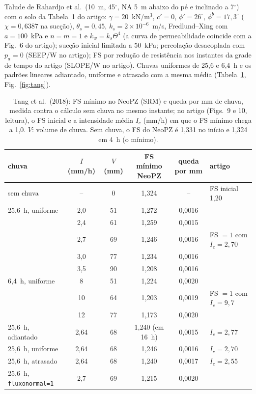 Talude de Rahardjo et al.\ (10~m, 45$^\circ$, NA 5~m abaixo do p\'e e inclinado a 7$^\circ$) com o solo da Tabela~1 do
artigo: $\gamma=20$~kN/m$^3$, $c'=0$, $\phi'=26^\circ$, $\phi^b=17{,}3^\circ$ ($\chi=0{,}6387$ na suc\c{c}\~ao),
$\theta_s=0{,}45$, $k_s=2\times10^{-6}$~m/s, Fredlund--Xing com $a=100$~kPa e $n=m=1$ e $k_w=k_s\Theta^4$ (a curva de
permeabilidade coincide com a Fig.~6 do artigo); suc\c{c}\~ao inicial limitada a 50~kPa; percola\c{c}\~ao
desacoplada com $p_a=0$ (SEEP/W no artigo); FS por redu\c{c}\~ao de resist\^encia nos instantes da grade de tempo do
artigo (SLOPE/W no artigo). Chuvas uniformes de 25,6 e 6,4~h e os padr\~oes lineares adiantado, uniforme e atrasado
com a mesma m\'edia (Tabela~\ref{tab:tang}, Fig.~\ref{fig:tang}).

\begin{table}[h!]
\centering\small
\caption{Tang et al.\ (2018): FS m\'inimo no NeoPZ (SRM) e queda por mm de chuva, medida contra o c\'alculo sem chuva
no mesmo instante; no artigo (Figs.~9 e 10, leitura), o FS inicial e a intensidade m\'edia $I_c$ (mm/h) em que o FS
m\'inimo chega a 1,0. $V$: volume de chuva. Sem chuva, o FS do NeoPZ \'e 1,331 no in\'icio e 1,324 em 4~h (o
m\'inimo).}\label{tab:tang}
\setlength{\tabcolsep}{3.5pt}
\begin{tabular}{lccccl}
\toprule
chuva & $I$ (mm/h) & $V$ (mm) & FS m\'inimo NeoPZ & queda por mm & artigo\\
\midrule
sem chuva & -- & 0 & 1,324 & -- & FS inicial 1,20\\
25,6~h, uniforme & 2,0 & 51 & 1,272 & 0,0016 & \\
 & 2,4 & 61 & 1,259 & 0,0015 & \\
 & 2,7 & 69 & 1,246 & 0,0016 & FS $=1$ com $I_c=2{,}70$\\
 & 3,0 & 77 & 1,234 & 0,0016 & \\
 & 3,5 & 90 & 1,208 & 0,0016 & \\
6,4~h, uniforme & 8 & 51 & 1,224 & 0,0020 & \\
 & 10 & 64 & 1,203 & 0,0019 & FS $=1$ com $I_c=9{,}7$\\
 & 12 & 77 & 1,173 & 0,0020 & \\
25,6~h, adiantado & 2,64 & 68 & 1,240 (em 16~h) & 0,0015 & $I_c=2{,}77$\\
25,6~h, uniforme & 2,64 & 68 & 1,246 & 0,0016 & $I_c=2{,}70$\\
25,6~h, atrasado & 2,64 & 68 & 1,240 & 0,0017 & $I_c=2{,}55$\\
\midrule
25,6~h, \texttt{fluxonormal=1} & 2,7 & 69 & 1,215 & 0,0020 & \\
\bottomrule
\end{tabular}
\end{table}


